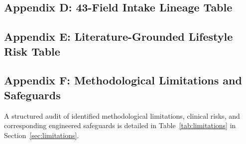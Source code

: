 \documentclass[11pt,a4paper]{article}
\begin{document}
\subsection*{Appendix D: 43-Field Intake Lineage Table}
\label{app:lineage}


\subsection*{Appendix E: Literature-Grounded Lifestyle Risk Table}
\label{app:lifestyle}


\subsection*{Appendix F: Methodological Limitations and Safeguards}
\label{app:limitations}
A structured audit of identified methodological limitations, clinical risks, and corresponding engineered safeguards is detailed in Table~\ref{tab:limitations} in Section~\ref{sec:limitations}.
\end{document}
